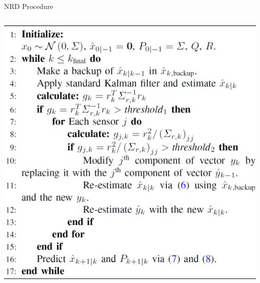 \documentclass[aspectratio=169]{beamer}
\begin{document}
\begin{frame}{NRD Procedure}
\begin{columns}
\begin{column}{0.45\textwidth}
			\includegraphics[width=\columnwidth]{Images/NRD_Procedure}
		\end{column}
	\end{columns}
\end{frame}
\end{document}
